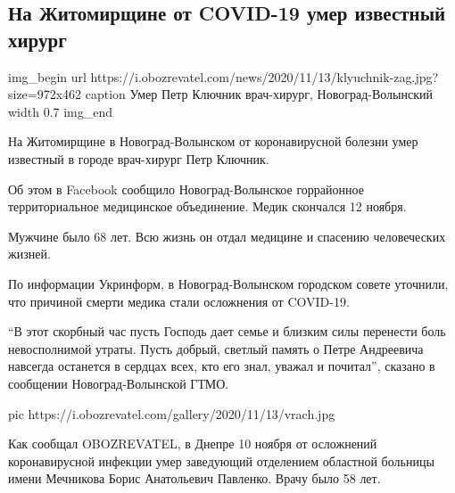  
 
 

\subsection{На Житомирщине от COVID-19 умер известный хирург}
\label{sec:13_11_2020.death.news.ua.obozrevatel.1.petr_kluchnik_novograd_volynskii}



\ifcmt
img_begin 
	url https://i.obozrevatel.com/news/2020/11/13/klyuchnik-zag.jpg?size=972x462
	caption Умер Петр Ключник \dshM врач-хирург, Новоград-Волынский
	width 0.7
img_end
\fi

На Житомирщине в Новоград-Волынском от коронавирусной болезни умер известный в
городе врач-хирург Петр Ключник.

Об этом в Facebook сообщило Новоград-Волынское горрайонное территориальное
медицинское объединение. Медик скончался 12 ноября. 

Мужчине было 68 лет. Всю жизнь он отдал медицине и спасению человеческих
жизней.

По информации Укринформ, в Новоград-Волынском городском совете уточнили, что
причиной смерти медика стали осложнения от COVID-19.

\enquote{В этот скорбный час пусть Господь дает семье и близким силы перенести боль
невосполнимой утраты. Пусть добрый, светлый память о Петре Андреевича навсегда
останется в сердцах всех, кто его знал, уважал и почитал}, \dshM сказано в
сообщении Новоград-Волынской ГТМО.

\ifcmt
pic https://i.obozrevatel.com/gallery/2020/11/13/vrach.jpg
\fi

Как сообщал OBOZREVATEL, в Днепре 10 ноября от осложнений коронавирусной
инфекции умер заведующий отделением областной больницы имени Мечникова Борис
Анатольевич Павленко. Врачу было 58
лет.
